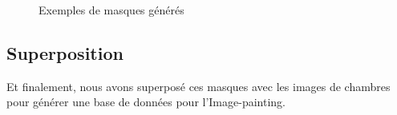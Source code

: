 \begin{figure}[!h]
    \centering
    \qquad
    \caption{Exemples de masques générés}%
    \label{fig:example}%
\end{figure}

\subsection{Superposition}
Et finalement, nous avons superposé ces masques avec les images de chambres pour générer une base de données pour l'Image-painting.

